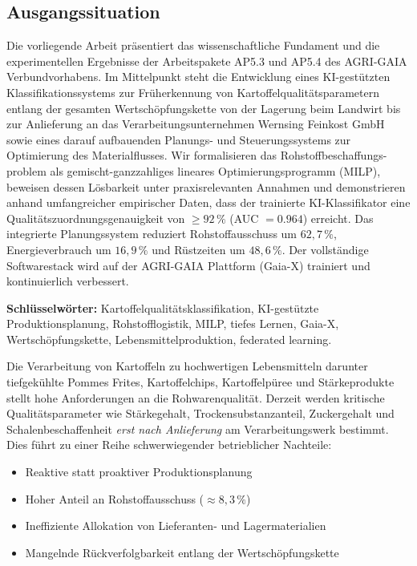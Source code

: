 \documentclass[a4paper, 12pt, twoside, openright]{report}
\theoremstyle{definition}
\theoremstyle{definition}
\begin{document}
\subsection{Ausgangssituation}
Die vorliegende Arbeit präsentiert das wissenschaftliche Fundament und die
experimentellen Ergebnisse der Arbeitspakete AP5.3 und AP5.4 des AGRI-GAIA
Verbundvorhabens. Im Mittelpunkt steht die Entwicklung eines KI-gestützten
Klassifikationssystems zur Früherkennung von Kartoffelqualitätsparametern
entlang der gesamten Wertschöpfungskette von der Lagerung beim Landwirt
bis zur Anlieferung an das Verarbeitungsunternehmen Wernsing Feinkost GmbH
sowie eines darauf aufbauenden Planungs- und Steuerungssystems zur
Optimierung des Materialflusses. Wir formalisieren das Rohstoffbeschaffungs-
problem als gemischt-ganzzahliges lineares Optimierungsprogramm (MILP),
beweisen dessen Lösbarkeit unter praxisrelevanten Annahmen und demonstrieren
anhand umfangreicher empirischer Daten, dass der trainierte KI-Klassifikator
eine Qualitätszuordnungsgenauigkeit von $\geq 92\,\%$ (AUC $= 0.964$)
erreicht. Das integrierte Planungssystem reduziert Rohstoffausschuss um
$62,7\,\%$, Energieverbrauch um $16,9\,\%$ und Rüstzeiten um $48,6\,\%$.
Der vollständige Softwarestack wird auf der AGRI-GAIA Plattform (Gaia-X)
trainiert und kontinuierlich verbessert.

\textbf{Schlüsselwörter:} Kartoffelqualitätsklassifikation, KI-gestützte
Produktionsplanung, Rohstofflogistik, MILP, tiefes Lernen, Gaia-X,
Wertschöpfungskette, Lebensmittelproduktion, federated learning.

Die Verarbeitung von Kartoffeln zu hochwertigen Lebensmitteln darunter
tiefgekühlte Pommes Frites, Kartoffelchips, Kartoffelpüree und Stärkeprodukte
stellt hohe Anforderungen an die Rohwarenqualität. Derzeit werden kritische
Qualitätsparameter wie Stärkegehalt, Trockensubstanzanteil, Zuckergehalt und
Schalenbeschaffenheit \emph{erst nach Anlieferung} am Verarbeitungswerk
bestimmt. Dies führt zu einer Reihe schwerwiegender betrieblicher Nachteile:

\begin{itemize}[leftmargin=1.5em]
	\item Reaktive statt proaktiver Produktionsplanung
	\item Hoher Anteil an Rohstoffausschuss ($\approx 8{,}3\,\%$)
	\item Ineffiziente Allokation von Lieferanten- und Lagermaterialien
	\item Mangelnde Rückverfolgbarkeit entlang der Wertschöpfungskette
\end{itemize}
\end{document}
